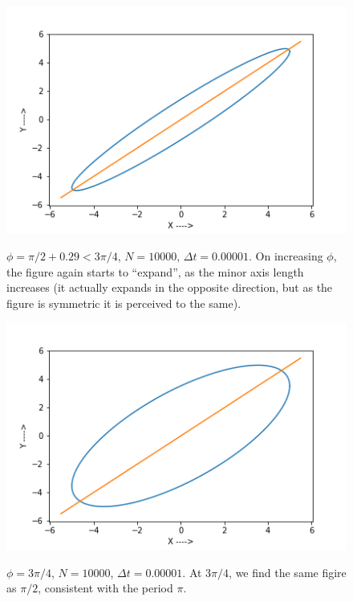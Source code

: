 \documentclass{report}
\begin{document}
\begin{figure}[H]
	\centering
	\includegraphics[width = \textwidth]{phiG.png}
	\label{phiG}
	\caption{$\phi=\pi/2+0.29<3\pi/4$, $N=10000$, $\Delta t=0.00001$. On increasing $\phi$, the figure again starts to ``expand'', as the minor axis length increases (it actually expands in the opposite direction, but as the figure is symmetric it is perceived to the same).}
\end{figure}
\begin{figure}[H]
	\centering
	\includegraphics[width = \textwidth]{phiH.png}
	\label{phiH}
	\caption{$\phi=3\pi/4$, $N=10000$, $\Delta t=0.00001$. At $3\pi/4$, we find the same figire as $\pi/2$, consistent with the period $\pi$.}
\end{figure}
\end{document}
